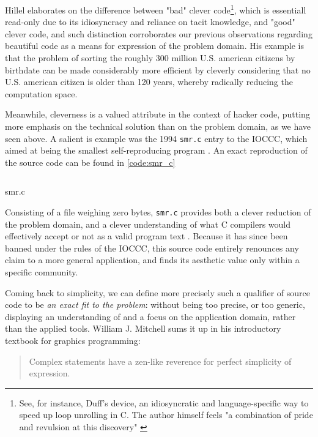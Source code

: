 Hillel elaborates on the difference between "bad" clever code\footnote{See, for instance, Duff's device, an idiosyncratic and language-specific way to speed up loop unrolling in C. The author himself feels "a combination of pride and revulsion at this discovery" \citep{duff_tom_1983}}, which is essentiall read-only due to its idiosyncracy and reliance on tacit knowledge, and "good" clever code, and such distinction corroborates our previous observations regarding beautiful code as a means for expression of the problem domain. His example is that the problem of sorting the roughly 300 million U.S. american citizens by birthdate can be made considerably more efficient by cleverly considering that no U.S. american citizen is older than 120 years, whereby radically reducing the computation space.

Meanwhile, cleverness is a valued attribute in the context of hacker code, putting more emphasis on the technical solution than on the problem domain, as we have seen above. A salient is example was the 1994 \lstinline{smr.c} entry to the IOCCC, which aimed at being the smallest self-reproducing program \citep{kanakarakis_international_2022}. An exact reproduction of the source code can be found in \ref{code:smr_c}

\begin{listing}
  \begin{verbatim}

\end{verbatim}
  \caption{smr.c}
  \label{code:smr_c}
\end{listing}

Consisting of a file weighing zero bytes, \lstinline{smr.c} provides both a clever reduction of the problem domain, and a clever understanding of what C compilers would effectively accept or not as a valid program text \citep{kanakarakis_international_2022a}. Because it has since been banned under the rules of the IOCCC, this source code entirely renounces any claim to a more general application, and finds its aesthetic value only within a specific community.

Coming back to simplicity, we can define more precisely such a qualifier of source code to be \emph{an exact fit to the problem}: without being too precise, or too generic, displaying an understanding of and a focus on the application domain, rather than the applied tools. William J. Mitchell sums it up in his introductory textbook for graphics programming:

\begin{quote}
  Complex statements have a zen-like reverence for perfect simplicity of expression. \citep{mitchell_art_1987}
\end{quote}

